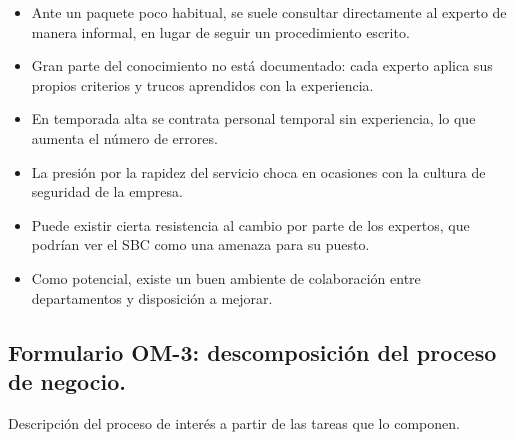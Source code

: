 \documentclass[12pt,a4paper,twoside,spanish]{article}      %
\begin{document}
\begin{itemize}
    \item Ante un paquete poco habitual, se suele consultar directamente al experto de manera informal, en lugar de seguir un procedimiento escrito.
    \item Gran parte del conocimiento no está documentado: cada experto aplica sus propios criterios y trucos aprendidos con la experiencia.
    \item En temporada alta se contrata personal temporal sin experiencia, lo que aumenta el número de errores.
    \item La presión por la rapidez del servicio choca en ocasiones con la cultura de seguridad de la empresa.
    \item Puede existir cierta resistencia al cambio por parte de los expertos, que podrían ver el SBC como una amenaza para su puesto.
    \item Como potencial, existe un buen ambiente de colaboración entre departamentos y disposición a mejorar.
\end{itemize}



\pagebreak
\subsection{Formulario OM-3: descomposición del proceso de negocio.}

Descripción del proceso de interés a partir de las tareas que lo componen.
\end{document}

